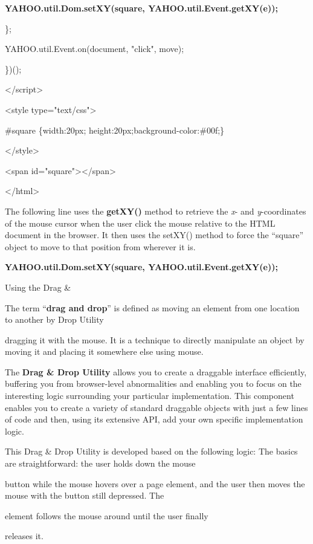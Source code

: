 \documentclass[
]{article}
\begin{document}
\textbf{YAHOO.util.Dom.setXY(\textquotesingle square\textquotesingle,
YAHOO.util.Event.getXY(e));}

\};

YAHOO.util.Event.on(document, "click", move);

\})();

\textless/script\textgreater{}

\textless style type="text/css"\textgreater{}

\#square \{width:20px; height:20px;background-color:\#00f;\}

\textless/style\textgreater{}

\textless span id="square"\textgreater\textless/span\textgreater{}

\textless/html\textgreater{}

The following line uses the \textbf{getXY()} method to retrieve the
\emph{x}- and \emph{y}-coordinates of the mouse cursor when the user
click the mouse relative to the HTML document in the browser. It then
uses the setXY() method to force the ``square'' object to move to that
position from wherever it is.

\textbf{YAHOO.util.Dom.setXY(\textquotesingle square\textquotesingle,
YAHOO.util.Event.getXY(e));}

Using the Drag \&

The term ``\textbf{drag and drop}'' is defined as moving an element from
one location to another by Drop Utility

dragging it with the mouse. It is a technique to directly manipulate an
object by moving it and placing it somewhere else using mouse.

The \textbf{Drag \& Drop Utility} allows you to create a draggable
interface efficiently, buffering you from browser-level abnormalities
and enabling you to focus on the interesting logic surrounding your
particular implementation. This component enables you to create a
variety of standard draggable objects with just a few lines of code and
then, using its extensive API, add your own specific implementation
logic.

This Drag \& Drop Utility is developed based on the following logic: The
basics are straightforward: the user holds down the mouse

button while the mouse hovers over a page element, and the user then
moves the mouse with the button still depressed. The

element follows the mouse around until the user finally

releases it.
\end{document}
